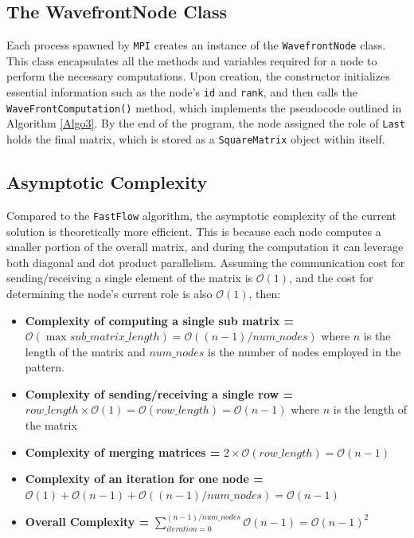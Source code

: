 \subsection*{The WavefrontNode Class}
Each process spawned by \texttt{MPI} creates an instance of the \texttt{WavefrontNode} class. This class encapsulates all the methods and variables required for a node to perform the necessary computations. Upon creation, the constructor initializes essential information such as the node's \texttt{id} and \texttt{rank}, and then calls the \texttt{WaveFrontComputation()} method, which implements the pseudocode outlined in Algorithm \ref{Algo3}. By the end of the program, the node assigned the role of \texttt{Last} holds the final matrix, which is stored as a \texttt{SquareMatrix} object within itself.

\subsection*{Asymptotic Complexity}
Compared to the \texttt{FastFlow} algorithm, the asymptotic complexity of the current solution is theoretically more efficient. This is because each node computes a smaller portion of the overall matrix, and during the computation it can leverage both diagonal and dot product parallelism. Assuming the communication cost for sending/receiving  a single element of the matrix is $\mathcal{O}(1)$, and the cost for determining the node's current role is also $\mathcal{O}(1)$, then:
\begin{itemize}


    \item \textbf{Complexity of computing a single sub matrix =} $\mathcal{O}(\max{sub\_matrix\_length}) = \mathcal{O}((n-1)/ num\_nodes )$ where $n$ is the length of the matrix and $num\_nodes$ is the number of nodes employed in the pattern.

    \item \textbf{Complexity of sending/receiving a single row =} $row\_length \times \mathcal{O}(1) = \mathcal{O}(row\_length) = \mathcal{O}(n - 1)$ where $n$ is the length of the matrix

    \item \textbf{Complexity of merging matrices =} $2 \times \mathcal{O}(row\_length) = \mathcal{O}(n - 1)$

    \item \textbf{Complexity of an iteration for one node =} $ \mathcal{O}(1) + \mathcal{O}(n - 1) + \mathcal{O}((n-1)/ num\_nodes) = \mathcal{O}(n-1)$

    \item \textbf{Overall Complexity =} $ \sum_{iteration = 0}^{(n-1) / num\_nodes}{\mathcal{O}(n-1)} = \mathcal{O}(n-1)^{2}$
\end{itemize}

